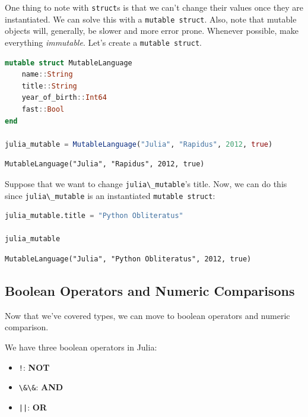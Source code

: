 \documentclass[
  notoc %
]{tufte-book}
\providecommand{\tightlist}{%
  \setlength{\itemsep}{0pt}\setlength{\parskip}{0pt}
}
\newcommand{\passthrough}[1]{#1}
\begin{document}
One thing to note with \passthrough{\lstinline!struct!}s is that we
can't change their values once they are instantiated. We can solve this
with a \passthrough{\lstinline!mutable struct!}. Also, note that mutable
objects will, generally, be slower and more error prone. Whenever
possible, make everything \emph{immutable}. Let's create a
\passthrough{\lstinline!mutable struct!}.

\begin{lstlisting}[language=Julia]
mutable struct MutableLanguage
    name::String
    title::String
    year_of_birth::Int64
    fast::Bool
end

julia_mutable = MutableLanguage("Julia", "Rapidus", 2012, true)
\end{lstlisting}

\begin{lstlisting}[language=Output]
MutableLanguage("Julia", "Rapidus", 2012, true)
\end{lstlisting}

Suppose that we want to change
\passthrough{\lstinline!julia\_mutable!}'s title. Now, we can do this
since \passthrough{\lstinline!julia\_mutable!} is an instantiated
\passthrough{\lstinline!mutable struct!}:

\begin{lstlisting}[language=Julia]
julia_mutable.title = "Python Obliteratus"

julia_mutable
\end{lstlisting}

\begin{lstlisting}[language=Output]
MutableLanguage("Julia", "Python Obliteratus", 2012, true)
\end{lstlisting}

\hypertarget{boolean-operators-and-numeric-comparisons}{%
\subsection{Boolean Operators and Numeric
Comparisons}\label{boolean-operators-and-numeric-comparisons}}

Now that we've covered types, we can move to boolean operators and
numeric comparison.

We have three boolean operators in Julia:

\begin{itemize}
\tightlist
\item
  \passthrough{\lstinline"!"}: \textbf{NOT}
\item
  \passthrough{\lstinline!\&\&!}: \textbf{AND}
\item
  \passthrough{\lstinline!||!}: \textbf{OR}
\end{itemize}
\end{document}
